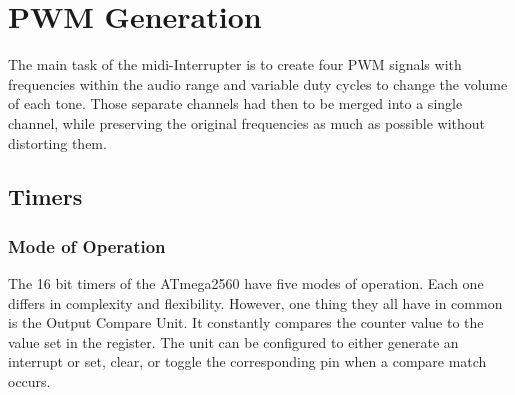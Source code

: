 \setchapterpreamble[u]{\margintoc}

\chapter{PWM Generation}

The main task of the \gls{midi}-Interrupter is to create four PWM signals with frequencies within the audio range and variable duty cycles to change the volume of each tone. Those separate channels had then to be merged into a single channel, while preserving the original frequencies as much as possible without distorting them.

\section{Timers}

\subsection{Mode of Operation}

The 16 bit timers of the ATmega2560 have five modes of operation. Each one differs in complexity and flexibility. However, one thing they all have in common is the Output Compare Unit. It constantly compares the counter value to the value set in the  register. The unit can be configured to either generate an interrupt or set, clear, or toggle the corresponding  pin when a compare match occurs.

